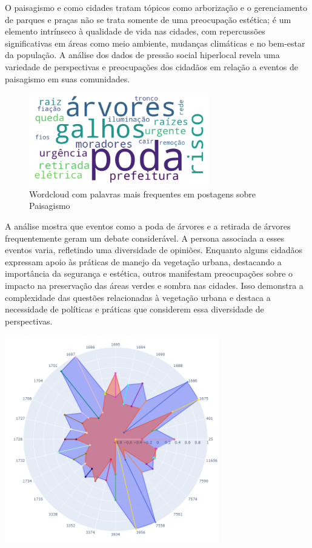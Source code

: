 O paisagismo e como cidades tratam tópicos como arborização e o gerenciamento de parques e praças não se trata somente de uma preocupação estética; é um elemento intrínseco à qualidade de vida nas cidades, com repercussões significativas em áreas como meio ambiente, mudanças climáticas e no bem-estar da população. A análise dos dados de pressão social hiperlocal revela uma variedade de perspectivas e preocupações dos cidadãos em relação a eventos de paisagismo em suas comunidades.

\begin{figure}[htb]
	\centering
	\includegraphics[width=0.7\textwidth]{images/wordcloud_landscape.png}
	\caption{Wordcloud com palavras mais frequentes em postagens sobre Paisagismo}
	\label{fig:wordcloud_landscape}
\end{figure}

A análise mostra que eventos como a poda de árvores e a retirada de árvores frequentemente geram um debate considerável. A persona associada a esses eventos varia, refletindo uma diversidade de opiniões. Enquanto alguns cidadãos expressam apoio às práticas de manejo da vegetação urbana, destacando a importância da segurança e estética, outros manifestam preocupações sobre o impacto na preservação das áreas verdes e sombra nas cidades. Isso demonstra a complexidade das questões relacionadas à vegetação urbana e destaca a necessidade de políticas e práticas que considerem essa diversidade de perspectivas.

\begin{quadro}[htb]
	\centering
	\includegraphics[width=0.7\textwidth]{images/social_barometer_landscape.png}
	\caption{Gráfico de Radar ilustrando a pressão social em relação ao tópico de Paisagismo}
	\label{fig:social_barometer_landscape}
\end{quadro}

